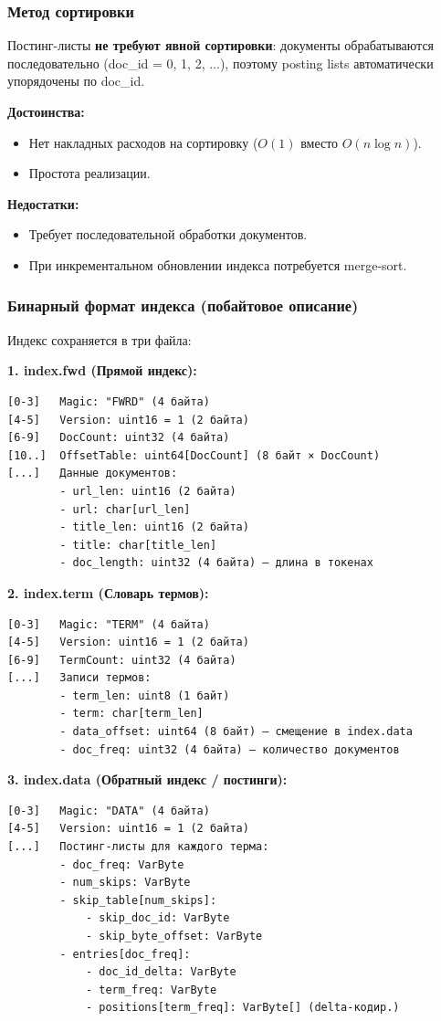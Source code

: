 \documentclass[a4paper,12pt]{article}
\begin{document}
\subsubsection{Метод сортировки}
Постинг-листы \textbf{не требуют явной сортировки}: документы обрабатываются последовательно (doc\_id = 0, 1, 2, ...), поэтому posting lists автоматически упорядочены по doc\_id.

\textbf{Достоинства:}
\begin{itemize}
    \item Нет накладных расходов на сортировку ($O(1)$ вместо $O(n \log n)$).
    \item Простота реализации.
\end{itemize}

\textbf{Недостатки:}
\begin{itemize}
    \item Требует последовательной обработки документов.
    \item При инкрементальном обновлении индекса потребуется merge-sort.
\end{itemize}

\subsubsection{Бинарный формат индекса (побайтовое описание)}
Индекс сохраняется в три файла:

\textbf{1. index.fwd (Прямой индекс):}
\begin{verbatim}
[0-3]   Magic: "FWRD" (4 байта)
[4-5]   Version: uint16 = 1 (2 байта)
[6-9]   DocCount: uint32 (4 байта)
[10..]  OffsetTable: uint64[DocCount] (8 байт × DocCount)
[...]   Данные документов:
        - url_len: uint16 (2 байта)
        - url: char[url_len]
        - title_len: uint16 (2 байта)
        - title: char[title_len]
        - doc_length: uint32 (4 байта) — длина в токенах
\end{verbatim}

\textbf{2. index.term (Словарь термов):}
\begin{verbatim}
[0-3]   Magic: "TERM" (4 байта)
[4-5]   Version: uint16 = 1 (2 байта)
[6-9]   TermCount: uint32 (4 байта)
[...]   Записи термов:
        - term_len: uint8 (1 байт)
        - term: char[term_len]
        - data_offset: uint64 (8 байт) — смещение в index.data
        - doc_freq: uint32 (4 байта) — количество документов
\end{verbatim}

\textbf{3. index.data (Обратный индекс / постинги):}
\begin{verbatim}
[0-3]   Magic: "DATA" (4 байта)
[4-5]   Version: uint16 = 1 (2 байта)
[...]   Постинг-листы для каждого терма:
        - doc_freq: VarByte
        - num_skips: VarByte
        - skip_table[num_skips]:
            - skip_doc_id: VarByte
            - skip_byte_offset: VarByte
        - entries[doc_freq]:
            - doc_id_delta: VarByte
            - term_freq: VarByte
            - positions[term_freq]: VarByte[] (delta-кодир.)
\end{verbatim}
\end{document}
